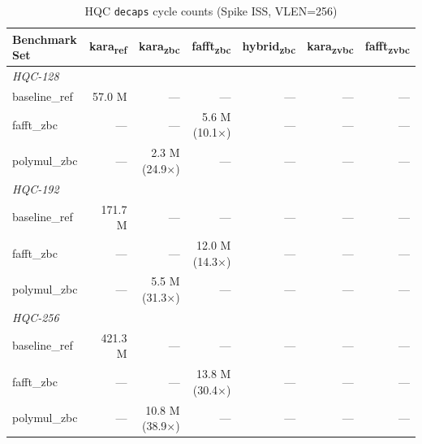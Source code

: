 \begin{table}[h]
  \centering
  \caption{HQC \texttt{decaps} cycle counts (Spike ISS, VLEN=256)}
  \label{tab:decaps_counts}
  \begin{tabular}{lrrrrrr}
    \toprule
    Benchmark Set & kara\textsubscript{ref} & kara\textsubscript{zbc} & fafft\textsubscript{zbc} & hybrid\textsubscript{zbc} & kara\textsubscript{zvbc} & fafft\textsubscript{zvbc} \\
    \midrule
    \multicolumn{7}{l}{\textit{HQC-128}} \\
    baseline_ref & 57.0 M & — & — & — & — & — \\
    fafft_zbc & — & — & 5.6 M (10.1×) & — & — & — \\
    polymul_zbc & — & 2.3 M (24.9×) & — & — & — & — \\
    \multicolumn{7}{l}{\textit{HQC-192}} \\
    baseline_ref & 171.7 M & — & — & — & — & — \\
    fafft_zbc & — & — & 12.0 M (14.3×) & — & — & — \\
    polymul_zbc & — & 5.5 M (31.3×) & — & — & — & — \\
    \multicolumn{7}{l}{\textit{HQC-256}} \\
    baseline_ref & 421.3 M & — & — & — & — & — \\
    fafft_zbc & — & — & 13.8 M (30.4×) & — & — & — \\
    polymul_zbc & — & 10.8 M (38.9×) & — & — & — & — \\
    \bottomrule
  \end{tabular}
\end{table}

